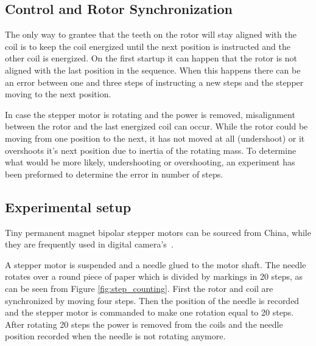 \subsection{Control and Rotor Synchronization}

The only way to grantee that the teeth on the rotor will stay aligned with the coil is to keep the coil energized until the next position is instructed and the other coil is energized. 
On the first startup it can happen that the rotor is not aligned with the last position in the sequence.
When this happens there can be an error between one and three steps of instructing a new steps and the stepper moving to the next position.

In case the stepper motor is rotating and the power is removed, misalignment between the rotor and the last energized coil can occur.
While the rotor could be moving from one position to the next, it has not moved at all (undershoot) or it overshoots it's next position due to inertia of the rotating mass. 
To determine what would be more likely, undershooting or overshooting, an experiment has been preformed to determine the error in number of steps.

\subsection{Experimental setup}

Tiny permanent magnet bipolar stepper motors can be sourced from China, while they are frequently used in digital camera's~\cite{nidec_stepper_2017}.

A stepper motor is suspended and a needle glued to the motor shaft.
The needle rotates over a round piece of paper which is divided by markings in 20 steps, as can be seen from Figure \ref{fig:step_counting}.
First the rotor and coil are synchronized by moving four steps.
Then the position of the needle is recorded and the stepper motor is commanded to make one rotation equal to 20 steps.
After rotating 20 steps the power is removed from the coils and the needle position recorded when the needle is not rotating anymore.

